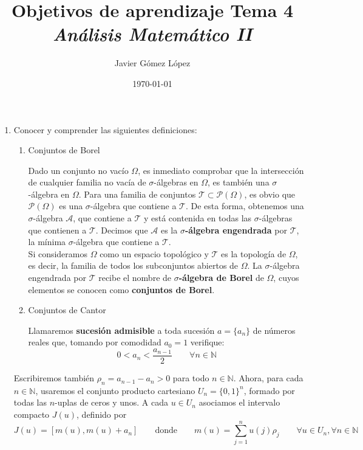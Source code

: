 \documentclass[a4paper, 12pt]{article}
\title{\textbf{Objetivos de aprendizaje Tema 4} \\ \textit{Análisis Matemático II}}
\author{Javier Gómez López}
\date{\today}
\begin{document}
\maketitle

\begin{enumerate}[label=\textbf{\arabic*}.]

\item Conocer y comprender las siguientes definiciones:

\begin{enumerate}[label=\textit{\alph*)}]
	\item Conjuntos de Borel
	
	Dado un conjunto no vacío \(\Omega\), es inmediato comprobar que la intersección de cualquier familia no vacía de \(\sigma\)-álgebras en \(\Omega\), es también una \(\sigma\)-álgebra en \(\Omega\). Para una familia de conjuntos \(\mathcal{T} \subset \mathcal{P} (\Omega)\), es obvio que \(\mathcal{P} (\Omega)\) es una \(\sigma\)-álgebra que contiene a \(\mathcal{T}\). De esta forma, obtenemos una \(\sigma\)-álgebra \(\mathcal{A}\), que contiene a \(\mathcal{T}\) y está contenida en todas las \(\sigma\)-álgebras que contienen a \(\mathcal{T}\). Decimos que \(\mathcal{A}\) es la \(\sigma\)\textbf{-álgebra engendrada} por \(\mathcal{T}\), la mínima \(\sigma\)-álgebra que contiene a \(\mathcal{T}\). \\
	
Si consideramos \(\Omega\) como un espacio topológico y \(\mathcal{T}\) es la topología de \(\Omega\), es decir, la familia de todos los subconjuntos abiertos de \(\Omega\). La \(\sigma\)-álgebra engendrada por \(\mathcal{T}\) recibe el nombre de \(\sigma\)\textbf{-álgebra de Borel} de \(\Omega\), cuyos elementos se conocen como \textbf{conjuntos de Borel}. \\

	\item Conjuntos de Cantor
	
Llamaremos \textbf{sucesión admisible} a toda sucesión \(a = \{a_n\}\) de números reales que, tomando por comodidad \(a_0 = 1\) verifique:
\[
	0 < a_n < \frac{a_{n-1}}{2} \qquad \forall n \in \mathbb{N}
\]
\end{enumerate}

Escribiremos también \(\rho_n = a_{n-1} - a_n > 0\) para todo \(n \in \mathbb{N}\). Ahora, para cada \(n \in \mathbb{N}\), usaremos el conjunto producto cartesiano \(U_n = \{0,1\}^n\), formado por todas las \(n\)-uplas  de ceros y unos. A cada \(u \in U_n\) asociamos el intervalo compacto \(J(u)\), definido por
\[
	J(u) = [ m(u), m(u) + a_n] \qquad \text{donde} \qquad m(u) = \sum_{j=1}^{n} u(j) \rho_j \qquad \forall u \in U_n, \forall n \in \mathbb{N}
\]


\end{enumerate}
\end{document}
